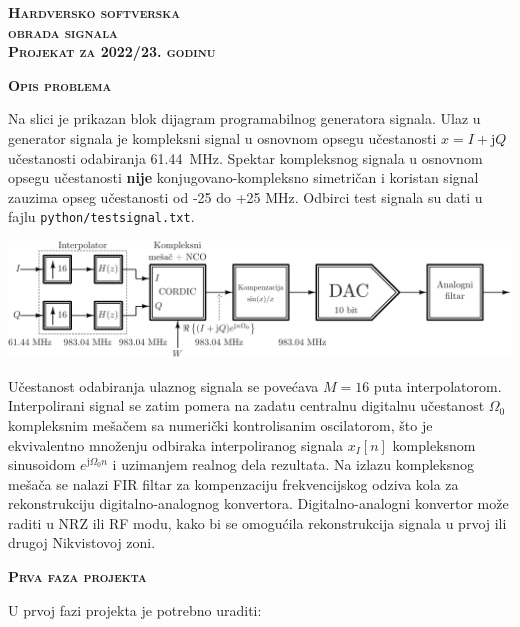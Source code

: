 \documentclass[a4paper]{article}
\begin{document}
\newcommand{\mr}[1]{\mathrm{#1}}
\renewcommand{\figurename}{Slika}

\begin{center}
\huge{\textbf{\textsc{Hardversko softverska \\obrada signala\\Projekat za 2022/23. godinu}}}
\end{center}


\begin{center}
\large{\textbf{\textsc{Opis problema}}}
\end{center}

Na slici je prikazan blok dijagram programabilnog generatora signala.
Ulaz u generator signala je kompleksni signal u osnovnom opsegu učestanosti $x=I+\mr{j} Q$ učestanosti odabiranja 61.44~MHz. Spektar kompleksnog signala u osnovnom opsegu učestanosti \textbf{nije} konjugovano-kompleksno simetričan i koristan signal zauzima opseg učestanosti od -25 do +25 MHz. 
Odbirci test signala su dati u fajlu \texttt{python/testsignal.txt}.

\begin{center}
\includegraphics[width=\textwidth]{fig/block_diagram.pdf}
\end{center}

Učestanost odabiranja ulaznog signala se povećava $M=16$ puta interpolatorom. 
Interpolirani signal se zatim pomera na zadatu centralnu digitalnu učestanost $\Omega_0$ kompleksnim mešačem sa numerički kontrolisanim oscilatorom, što je ekvivalentno množenju odbiraka interpoliranog signala $x_I[n]$ kompleksnom sinusoidom $e^{\mr{j}\Omega_0 n}$ i uzimanjem realnog dela rezultata.
Na izlazu kompleksnog mešača se nalazi FIR filtar za kompenzaciju frekvencijskog odziva kola za rekonstrukciju digitalno-analognog konvertora.
Digitalno-analogni konvertor može raditi u NRZ ili RF modu, kako bi se omogućila rekonstrukcija signala u prvoj ili drugoj Nikvistovoj zoni.

\begin{center}
\large{\textbf{\textsc{Prva faza projekta}}}
\end{center}

U prvoj fazi projekta je potrebno uraditi:
\end{document}
